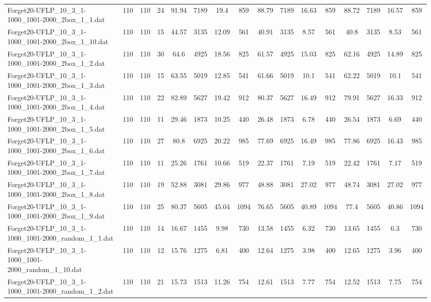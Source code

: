 \begin{sidewaystable}[!ht]
{\begin{tabular}{lccccccccccccccc}
Forget20-UFLP\_10\_3\_1-1000\_1001-2000\_2box\_1\_1.dat & 110 & 110 & 24 & 91.94 & 7189 & 19.4 & 859 & 88.79 & 7189 & 16.63 & 859 & 88.72 & 7189 & 16.57 & 859 \\
Forget20-UFLP\_10\_3\_1-1000\_1001-2000\_2box\_1\_10.dat & 110 & 110 & 15 & 44.57 & 3135 & 12.09 & 561 & 40.91 & 3135 & 8.57 & 561 & 40.8 & 3135 & 8.53 & 561 \\
Forget20-UFLP\_10\_3\_1-1000\_1001-2000\_2box\_1\_2.dat & 110 & 110 & 30 & 64.6 & 4925 & 18.56 & 825 & 61.57 & 4925 & 15.03 & 825 & 62.16 & 4925 &  \textcolor{blue2}{14.89} & 825 \\
Forget20-UFLP\_10\_3\_1-1000\_1001-2000\_2box\_1\_3.dat & 110 & 110 & 15 & 63.55 & 5019 & 12.85 & 541 & 61.66 & 5019 & 10.1 & 541 & 62.22 & 5019 & 10.1 & 541 \\
Forget20-UFLP\_10\_3\_1-1000\_1001-2000\_2box\_1\_4.dat & 110 & 110 & 22 & 82.89 & 5627 & 19.42 & 912 & 80.37 & 5627 & 16.49 & 912 & 79.91 & 5627 & 16.33 & 912 \\
Forget20-UFLP\_10\_3\_1-1000\_1001-2000\_2box\_1\_5.dat & 110 & 110 & 11 & 29.46 & 1873 & 10.25 & 440 & 26.48 & 1873 & 6.78 & 440 & 26.54 & 1873 &  \textcolor{blue2}{6.69} & 440 \\
Forget20-UFLP\_10\_3\_1-1000\_1001-2000\_2box\_1\_6.dat & 110 & 110 & 27 & 80.8 & 6925 & 20.22 & 985 & 77.69 & 6925 & 16.49 & 985 & 77.86 & 6925 &  \textcolor{blue2}{16.43} & 985 \\
Forget20-UFLP\_10\_3\_1-1000\_1001-2000\_2box\_1\_7.dat & 110 & 110 & 11 & 25.26 & 1761 & 10.66 & 519 & 22.37 & 1761 & 7.19 & 519 & 22.42 & 1761 & 7.17 & 519 \\
Forget20-UFLP\_10\_3\_1-1000\_1001-2000\_2box\_1\_8.dat & 110 & 110 & 19 & 52.88 & 3081 & 29.86 & 977 & 48.88 & 3081 & 27.02 & 977 & 48.74 & 3081 & 27.02 & 977 \\
Forget20-UFLP\_10\_3\_1-1000\_1001-2000\_2box\_1\_9.dat & 110 & 110 & 25 & 80.37 & 5605 & 45.04 & 1094 & 76.65 & 5605 & 40.89 & 1094 & 77.4 & 5605 & 40.86 & 1094 \\
Forget20-UFLP\_10\_3\_1-1000\_1001-2000\_random\_1\_1.dat & 110 & 110 & 14 & 16.67 & 1455 & 9.98 & 730 & 13.58 & 1455 & 6.32 & 730 & 13.65 & 1455 &  \textcolor{blue2}{6.3} & 730 \\
Forget20-UFLP\_10\_3\_1-1000\_1001-2000\_random\_1\_10.dat & 110 & 110 & 12 & 15.76 & 1275 & 6.81 & 400 & 12.64 & 1275 & 3.98 & 400 & 12.65 & 1275 &  \textcolor{blue2}{3.96} & 400 \\
Forget20-UFLP\_10\_3\_1-1000\_1001-2000\_random\_1\_2.dat & 110 & 110 & 21 & 15.73 & 1513 & 11.26 & 754 & 12.61 & 1513 & 7.77 & 754 & 12.52 & 1513 & 7.75 & 754 \\

\end{tabular}}
\end{sidewaystable}
